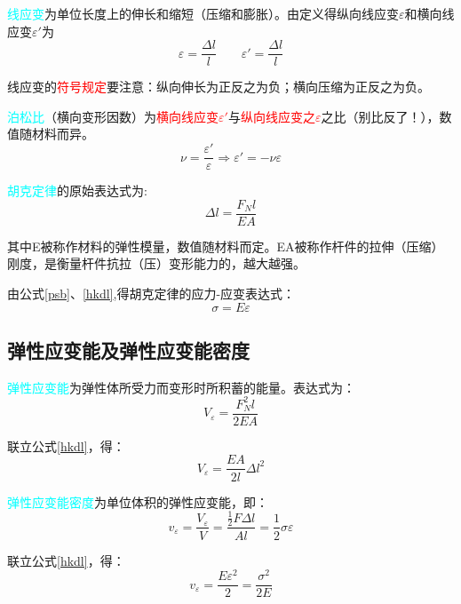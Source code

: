 \documentclass[10pt,a4paper]{ctexart}
\begin{document}
\textcolor{cyan}{线应变}为单位长度上的伸长和缩短（压缩和膨胀）。由定义得纵向线应变$\varepsilon$和横向线应变$\varepsilon'$为
\begin{equation}
\varepsilon=\frac{\Delta l}{l} \qquad%
  \varepsilon'=\frac{\Delta l}{l}
\end{equation}

线应变的\textcolor{red}{符号规定}要注意：纵向伸长为正反之为负；横向压缩为正反之为负。

\textcolor{cyan}{泊松比}（横向变形因数）为\textcolor{red}{横向线应变$\varepsilon'$}与\textcolor{red}{纵向线应变之$\varepsilon$}之比（别比反了！），数值随材料而异。
\begin{equation}
 \nu=\frac{\varepsilon'}{\varepsilon} \Rightarrow \varepsilon'=-\nu \varepsilon
 \label{psb}
\end{equation}

\textcolor{cyan}{胡克定律}的原始表达式为:
\begin{equation}
\Delta l=\frac{F_N l}{EA}
\label{hkdl}
\end{equation}

其中E被称作材料的弹性模量，数值随材料而定。EA被称作杆件的拉伸（压缩）刚度，是衡量杆件抗拉（压）变形能力的，越大越强。

由公式\ref{psb}、\ref{hkdl},得胡克定律的应力-应变表达式：
\begin{equation}
\sigma=E\varepsilon
\end{equation}
\subsection{弹性应变能及弹性应变能密度}
\textcolor{cyan}{弹性应变能}为弹性体所受力而变形时所积蓄的能量。表达式为：
\begin{equation}
	V_{\varepsilon}=\frac{F^2_N l}{2EA}
\end{equation}

联立公式\ref{hkdl}，得：
\begin{equation}
	V_{\varepsilon}=\frac{EA}{2l}\Delta l^2
\end{equation}

\textcolor{cyan}{弹性应变能密度}为单位体积的弹性应变能，即：
\begin{equation}
	v_{\varepsilon}=\frac{V_{\varepsilon}}{V}=\frac{\frac{1}{2}F\Delta l}{Al}=\frac{1}{2}\sigma\varepsilon
\end{equation}

联立公式\ref{hkdl}，得：
\begin{equation}
	v_{\varepsilon}=\frac{E\varepsilon^2}{2}=\frac{\sigma^2}{2E}
\end{equation}
	 
\end{document}
